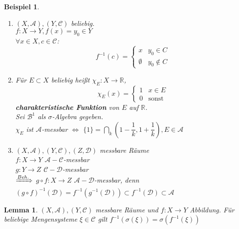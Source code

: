 \documentclass[11pt]{memoir}
\theoremstyle{changebreak}
\newtheorem{Beispiel}{Beispiel}[chapter]
\newtheorem{Lemma}{Lemma}[chapter]
\begin{document}
\begin{Beispiel}

\begin{enumerate}
	\item $(X, \mathscr{A}), (Y, \mathscr{C})$ beliebig. \\
	$f: X \rightarrow Y, f(x) = y_0 \in Y$ \\
	$\forall x \in X, c \in \mathscr{C}$:
	\begin{equation}
		f^{-1}(c) =
		\begin{cases}
			x & y_0 \in C \\
			\emptyset & y_0 \notin C
		\end{cases}
	\end{equation}
	\item Für $E \subset X$ beliebig heißt $\chi_E: X \rightarrow \mathbb{R}$, \\
	\begin{equation}
		\chi_E(x) =
		\begin{cases}
			1 & x \in E \\
			0 & \text{sonst}
		\end{cases}
	\end{equation}
	\textbf{charakteristische Funktion} von $E$ auf $\mathbb{R}$. \\
	Sei $\mathscr{B}^1$ als $\sigma$-Algebra gegeben. \\
	$\chi_E$ ist $\mathscr{A}$-messbar $\Leftrightarrow$ $\{1\} = \bigcap\limits_k \left(1- \dfrac{1}{k}, 1 + \dfrac{1}{k}\right), E \in \mathscr{A}$
	\item $(X, \mathscr{A}), (Y, \mathscr{C}), (Z, \mathscr{D})$ messbare Räume \\
	$f: X \rightarrow Y$ $ \mathscr{A}-\mathscr{C}$-messbar \\
	$g: Y \rightarrow Z$ $ \mathscr{C}-\mathscr{D}$-messbar \\
	$\xRightarrow{Beh.}$ $  g \circ f: X \rightarrow Z$ $ \mathscr{A}-\mathscr{D}$-messbar, denn \\
	$(g \circ f)^{-1}(\mathscr{D}) = f^{-1}(g^{-1}(\mathscr{D})) \subset f^{-1}(\mathscr{D}) \subset \mathscr{A}$
\end{enumerate}
\end{Beispiel}

\begin{Lemma}
$(X, \mathscr{A}), (Y, \mathscr{C})$ messbare Räume und $f: X \rightarrow Y$ Abbildung. Für beliebige Mengensysteme $\xi \in \mathscr{C}$ gilt $f^{-1}(\sigma(\xi)) = \sigma(f^{-1}(\xi))$
\end{Lemma}
\end{document}

